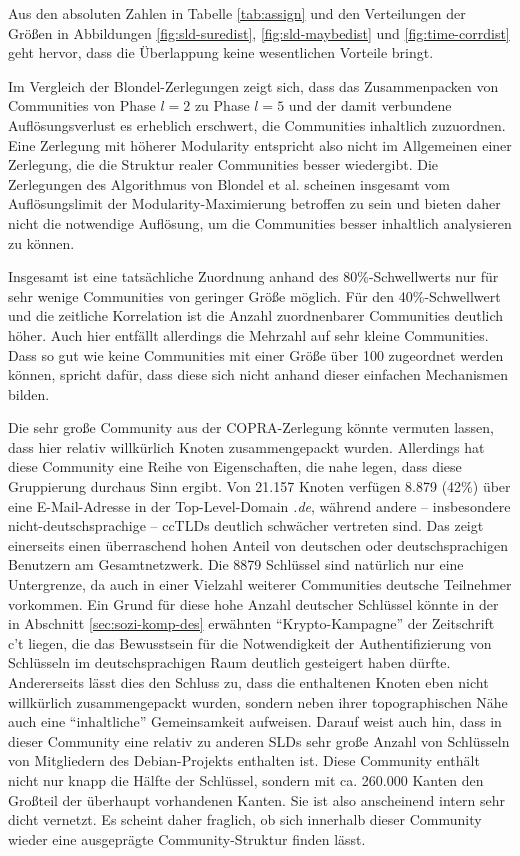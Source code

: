 Aus den absoluten Zahlen in Tabelle \ref{tab:assign} und den
Verteilungen der Größen in Abbildungen \ref{fig:sld-suredist},
\ref{fig:sld-maybedist} und \ref{fig:time-corrdist} geht hervor, dass
die Überlappung keine wesentlichen Vorteile bringt. 

Im Vergleich der Blondel-Zerlegungen zeigt sich, dass das
Zusammenpacken von Communities von Phase $l=2$ zu Phase $l=5$ und der
damit verbundene Auflösungsverlust es erheblich erschwert, die
Communities inhaltlich zuzuordnen. Eine Zerlegung mit höherer
Modularity entspricht also nicht im Allgemeinen einer Zerlegung, die
die Struktur realer Communities besser wiedergibt. Die Zerlegungen des
Algorithmus von Blondel et al. scheinen insgesamt vom
Auflösungslimit der Modularity-Maximierung betroffen zu sein und
bieten daher nicht die notwendige Auflösung, um die Communities
besser inhaltlich analysieren zu können.

Insgesamt ist eine tatsächliche Zuordnung anhand des
80\%-Schwellwerts nur für sehr wenige Communities von geringer
Größe möglich. Für den 40\%-Schwellwert und die zeitliche
Korrelation ist die Anzahl zuordnenbarer Communities deutlich
höher. Auch hier entfällt allerdings die Mehrzahl auf sehr kleine
Communities.  Dass so gut wie keine Communities mit einer Größe
über 100 zugeordnet werden können, spricht dafür, dass diese
sich nicht anhand dieser einfachen Mechanismen bilden.

Die sehr große Community aus der COPRA-Zerlegung könnte vermuten
lassen, dass hier relativ willkürlich Knoten zusammengepackt
wurden. Allerdings hat diese Community eine Reihe von Eigenschaften,
die nahe legen, dass diese Gruppierung durchaus Sinn ergibt. Von 21.157
Knoten verfügen 8.879 (42\%) über eine E-Mail-Adresse in der
Top-Level-Domain \emph{.de}, während andere -- insbesondere
nicht-deutschsprachige -- ccTLDs deutlich schwächer vertreten
sind. Das zeigt einerseits einen überraschend hohen Anteil von
deutschen oder deutschsprachigen Benutzern am Gesamtnetzwerk. Die 8879
Schlüssel sind natürlich nur eine Untergrenze, da auch in einer
Vielzahl weiterer Communities deutsche Teilnehmer vorkommen. Ein Grund
für diese hohe Anzahl deutscher Schlüssel könnte in der in
Abschnitt \ref{sec:sozi-komp-des} erwähnten ``Krypto-Kampagne'' der
Zeitschrift c't liegen, die das Bewusstsein für die Notwendigkeit
der Authentifizierung von Schlüsseln im deutschsprachigen Raum
deutlich gesteigert haben dürfte. Andererseits lässt dies den
Schluss zu, dass die enthaltenen Knoten eben nicht willkürlich
zusammengepackt wurden, sondern neben ihrer topographischen Nähe
auch eine ``inhaltliche'' Gemeinsamkeit aufweisen. Darauf weist auch
hin, dass in dieser Community eine relativ zu anderen SLDs sehr große
Anzahl von Schlüsseln von Mitgliedern des Debian-Projekts enthalten
ist. Diese Community enthält nicht nur knapp die Hälfte der
Schlüssel, sondern mit ca. 260.000 Kanten den Großteil der
überhaupt vorhandenen Kanten. Sie ist also anscheinend intern sehr
dicht vernetzt. Es scheint daher fraglich, ob sich innerhalb dieser
Community wieder eine ausgeprägte Community-Struktur finden lässt.


